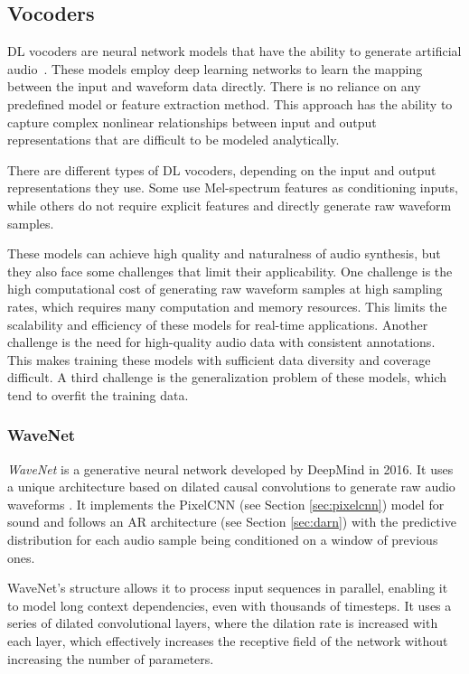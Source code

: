 \subsection{Vocoders} \label{sec:vocoders}

\Ac{DL} vocoders are neural network models that have the ability to generate artificial audio~\cite{mehrish_review_2023}. These models employ deep learning networks to learn the mapping between the input and waveform data directly. There is no reliance on any predefined model or feature extraction method. This approach has the ability to capture complex nonlinear relationships between input and output representations that are difficult to be modeled analytically.

There are different types of \ac{DL} vocoders, depending on the input and output representations they use. Some use Mel-spectrum features as conditioning inputs, while others do not require explicit features and directly generate raw waveform samples.

These models can achieve high quality and naturalness of audio synthesis, but they also face some challenges that limit their applicability. One challenge is the high computational cost of generating raw waveform samples at high sampling rates, which requires many computation and memory resources. This limits the scalability and efficiency of these models for real-time applications. Another challenge is the need for high-quality audio data with consistent annotations. This makes training these models with sufficient data diversity and coverage difficult. A third challenge is the generalization problem of these models, which tend to overfit the training data.

\subsubsection{WaveNet} \label{sec:wavenet}

\textit{WaveNet} is a generative neural network developed by DeepMind in 2016. It uses a unique architecture based on dilated causal convolutions to generate raw audio waveforms \cite{oord_wavenet_2016}. It implements the PixelCNN (see Section \ref{sec:pixelcnn}) model for sound and follows an \ac{AR} architecture (see Section \ref{sec:darn}) with the predictive distribution for each audio sample being conditioned on a window of previous ones.

WaveNet's structure allows it to process input sequences in parallel, enabling it to model long context dependencies, even with thousands of timesteps. It uses a series of dilated convolutional layers, where the dilation rate is increased with each layer, which effectively increases the receptive field of the network without increasing the number of parameters.

